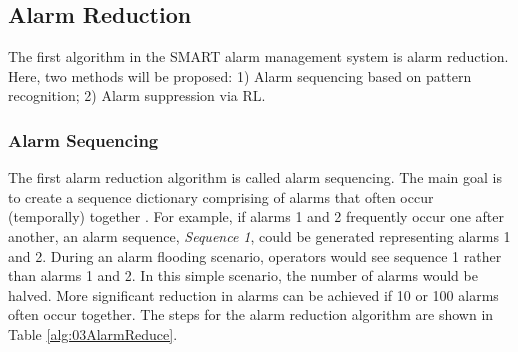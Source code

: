 \subsection{Alarm Reduction}
The first algorithm in the SMART alarm management system is alarm reduction. Here, two methods will be proposed: 1) Alarm sequencing based on pattern recognition; 2) Alarm suppression via RL.

\subsubsection{Alarm Sequencing}
The first alarm reduction algorithm is called alarm sequencing.  The main goal is to create a sequence dictionary comprising of alarms that often occur (temporally) together \cite{alarm_sequence}.  For example, if alarms 1 and 2 frequently occur one after another, an alarm sequence, \emph{Sequence 1}, could be generated representing alarms 1 and 2. During an alarm flooding scenario, operators would see sequence 1 rather than alarms 1 and 2. In this simple scenario, the number of alarms would be halved.  More significant reduction in alarms can be achieved if 10 or 100 alarms often occur together.  The steps for the alarm reduction algorithm are shown in Table \ref{alg:03AlarmReduce}.

